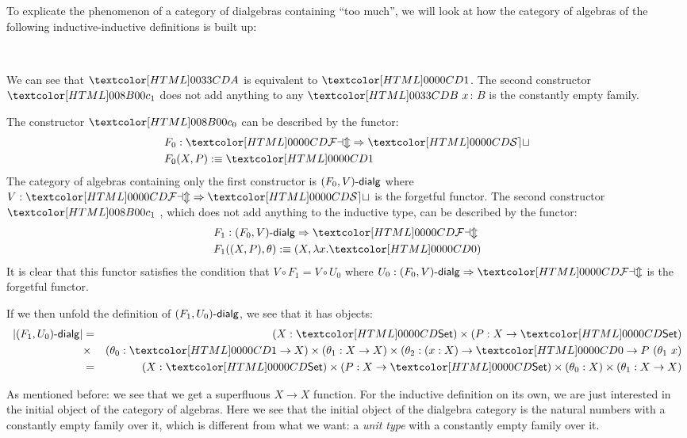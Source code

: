 \begin{remark}
  To explicate the phenomenon of a category of dialgebras containing
  ``too much'', we will look at how the category of algebras of the
  following inductive-inductive definitions is built up:
  \begin{sorts}
    \sortnamety{\Aty}{\Set} \\
    \sortnamety{\Bty}{\Aty \to \Set}
  \end{sorts}
  \begin{datatype}{\Aty}{}
    \constr{\Aco}{\Aty}
  \end{datatype}
  \begin{datatype}{\Bty}{}
  \end{datatype}
  We can see that $\Aty$ is equivalent to $\unitty$. The second
  constructor $\Bci$ does not add anything to any $\Bty\ x$: $B$ is
  the constantly empty family.

  The constructor $\Aco$ can be described by
  the functor:
  \begin{align*}
    &F_0 : \Func{\FAM}{\SET} \\
    &F_0 (X , P) \ddefeq \unitty
  \end{align*}
  The category of algebras containing only the first constructor is
  $\dialgcat{F_0}{V}$ where $V : \Func{\FAM}{\SET}$ is the forgetful
  functor. The second constructor $\Bci$ , which does not add anything
  to the inductive type, can be described by the functor:
  \begin{align*}
    &F_1 : \Func{\dialgcat{F_0}{V}}{\FAM} \\
    &F_1 ((X , P) , \theta) \ddefeq (X , \lambda x . \emptyty)
  \end{align*}
  It is clear that this functor satisfies the condition that
  $V \circ F_1 = V \circ U_0$ where
  $U_0 : \Func{\dialgcat{F_0}{V}}{\FAM}$ is the forgetful functor.

  If we then unfold the definition of $\dialgcat{F_1}{U_0}$, we see
  that it has objects:
  \begin{align*}
    | \dialgcat{F_1}{U_0} | &= &(X : \Set) \times (P : X \to \Set) \\
    &\times &(\theta_0 : \unitty \to X) \times (\theta_1 : X \to X) \times (\theta_2 :  (x : X) \to \emptyty \to P\ (\theta_1\ x) \\
    &= &(X : \Set) \times (P : X \to \Set) \times (\theta_0 : X) \times (\theta_1 : X \to X)
  \end{align*}
  
  As mentioned before: we see that we get a superfluous $X \to X$
  function. For the inductive definition on its own, we are just
  interested in the initial object of the category of algebras. Here
  we see that the initial object of the dialgebra category is the
  natural numbers with a constantly empty family over it, which is
  different from what we want: a \emph{unit type} with a constantly
  empty family over it.
\end{remark}

